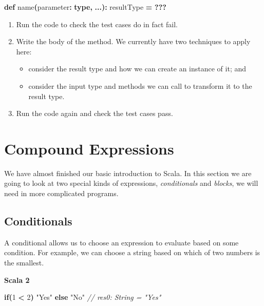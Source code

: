 \documentclass[11pt,a5paper,]{book}
\newenvironment{Shaded}{\begin{snugshade}}{\end{snugshade}}
\newcommand{\CommentTok}[1]{\textcolor[rgb]{0.56,0.35,0.01}{\textit{#1}}}
\newcommand{\ControlFlowTok}[1]{\textcolor[rgb]{0.13,0.29,0.53}{\textbf{#1}}}
\newcommand{\DecValTok}[1]{\textcolor[rgb]{0.00,0.00,0.81}{#1}}
\newcommand{\FunctionTok}[1]{\textcolor[rgb]{0.00,0.00,0.00}{#1}}
\newcommand{\KeywordTok}[1]{\textcolor[rgb]{0.13,0.29,0.53}{\textbf{#1}}}
\newcommand{\NormalTok}[1]{#1}
\newcommand{\OperatorTok}[1]{\textcolor[rgb]{0.81,0.36,0.00}{\textbf{#1}}}
\newcommand{\StringTok}[1]{\textcolor[rgb]{0.31,0.60,0.02}{#1}}
\providecommand{\tightlist}{%
  \setlength{\itemsep}{0pt}\setlength{\parskip}{0pt}}
\begin{document}
\begin{Shaded}
\begin{Highlighting}[]
\KeywordTok{def} \FunctionTok{name}\OperatorTok{(}\NormalTok{parameter}\OperatorTok{:} \KeywordTok{type}\OperatorTok{,} \OperatorTok{...):}\NormalTok{ resultType }\OperatorTok{=}
 \OperatorTok{???}
\end{Highlighting}
\end{Shaded}

\begin{enumerate}
\def\labelenumi{\arabic{enumi}.}
\setcounter{enumi}{3}
\tightlist
\item
  Run the code to check the test cases do in fact fail.
\item
  Write the body of the method. We currently have two techniques to
  apply here:

  \begin{itemize}
  \tightlist
  \item
    consider the result type and how we can create an instance of it;
    and
  \item
    consider the input type and methods we can call to transform it to
    the result type.
  \end{itemize}
\item
  Run the code again and check the test cases pass.
\end{enumerate}

\hypertarget{compound-expressions}{%
\section{Compound Expressions}\label{compound-expressions}}

We have almost finished our basic introduction to Scala. In this section
we are going to look at two special kinds of expressions,
\emph{conditionals} and \emph{blocks}, we will need in more complicated
programs.

\hypertarget{conditionals}{%
\subsection{Conditionals}\label{conditionals}}

A conditional allows us to choose an expression to evaluate based on
some condition. For example, we can choose a string based on which of
two numbers is the smallest.

\textbf{Scala 2}

\begin{Shaded}
\begin{Highlighting}[]
\ControlFlowTok{if}\OperatorTok{(}\DecValTok{1} \OperatorTok{\textless{}} \DecValTok{2}\OperatorTok{)} \StringTok{"Yes"} \ControlFlowTok{else} \StringTok{"No"}
\CommentTok{// res0: String = "Yes"}
\end{Highlighting}
\end{Shaded}
\end{document}
